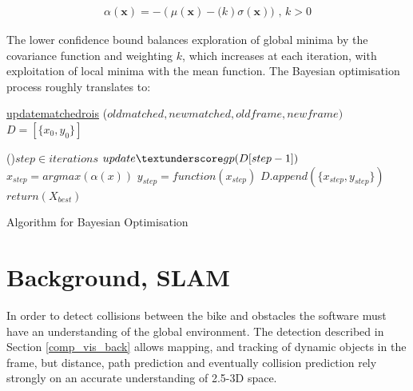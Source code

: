 \documentclass[11pt,twoside]{report}
\begin{document}
\begin{equation}
\begin{aligned}
\alpha(\mathbf{x}) = -(\mu(\mathbf{x}) - \mathit(k) \sigma (\mathbf{x})) \text{ , } k>0
\end{aligned}
\label{gp_lower_confidence}
\end{equation}


The lower confidence bound balances exploration of global minima by the covariance function and weighting $k$, which increases at each iteration, with exploitation of local minima with the mean function. The Bayesian optimisation process roughly translates to:

\begin{algorithm}[H]
	\DontPrintSemicolon
	\SetAlgoLined
	\underline{update\textunderscore matched\textunderscore rois} ($old$\textunderscore$matched,new$\textunderscore$matched,old$\textunderscore$frame,new$\textunderscore$frame)$\;
	\texttt{\\}
	$D = [\{ x_{0},y_{0} \}]$ 
	
	\ForEach(){$step \in iterations$}{
		$update \textunderscore gp(D[step-1])$ 
		$x_{step} = argmax(\alpha(x))$ 
		$y_{step} = function(x_{step})$ 
		$D.append( \{ x_{step},y_{step} \} )$ 
	}
	$return (X_{best})$ 
	\texttt{\\}
	\caption{Algorithm for Bayesian Optimisation}
	\label{alg:weights}
\end{algorithm}



\section{Background, SLAM} \label{back_slam}
In order to detect collisions between the bike and obstacles the software must have an understanding of the global environment. The detection described in Section \ref{comp_vis_back} allows mapping, and tracking of dynamic objects in the frame, but distance, path prediction and eventually collision prediction rely strongly on an accurate understanding of 2.5-3D space.
\end{document}
